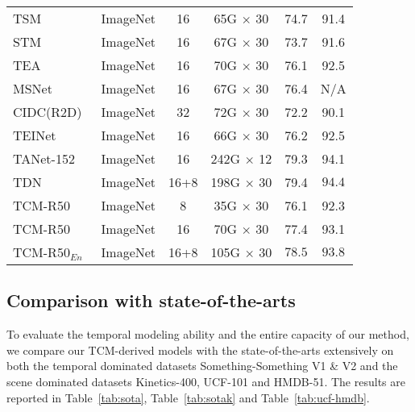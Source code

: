 \documentclass[journal]{IEEEtran}
\begin{document}
\begin{table*}
\begin{tabular}{l|c|c|c|c|c}
TSM~\cite{lin2019tsm}      & ImageNet & 16  & 65G $\times$ 30    & 74.7           & 91.4          \\
STM~\cite{jiang2019stm}      & ImageNet & 16    & 67G $\times$ 30  & 73.7           & 91.6    \\
TEA~\cite{li2020tea}    & ImageNet & 16       &  70G  $\times$ 30    & 76.1       &  92.5      \\
MSNet~\cite{kwon2020motionsqueeze}     & ImageNet & 16  & 67G $\times$ 30  & 76.4           & N/A \\
CIDC(R2D)~\cite{li2020directional}  &ImageNet & 32    & 72G $\times$ 30   & 72.2           & 90.1 \\
TEINet~\cite{liu2020teinet} & ImageNet &16  & 66G $\times$ 30    & 76.2           & 92.5           \\
TANet-152~\cite{liu2020tam} & ImageNet &16  & 242G $\times$ 12   & 79.3           & 94.1           \\
TDN~\cite{wang2021tdn}    & ImageNet  & 16+8  & 198G $\times$ 30  & 79.4           & $\mathbf{94.4}$  \\
\hline
TCM-R50        & ImageNet & 8      &     35G $\times$ 30           & 76.1     & 92.3       \\
TCM-R50        & ImageNet & 16     &     70G $\times$ 30            & 77.4     & 93.1               \\
TCM-R50$_{En}$   & ImageNet & 16+8     &    105G $\times$ 30      & $\mathbf{78.5}$       & $\mathbf{93.8}$     \\
\hline
\end{tabular}
\end{table*}

\subsection{Comparison with state-of-the-arts}
To evaluate the temporal modeling ability and the entire capacity of our method, we compare our TCM-derived models with the state-of-the-arts extensively on both the temporal dominated datasets Something-Something V1 \& V2 and the scene dominated datasets Kinetics-400, UCF-101 and HMDB-51. The results are reported in Table~\ref{tab:sota}, Table~\ref{tab:sotak} and Table~\ref{tab:ucf-hmdb}.
\end{document}
